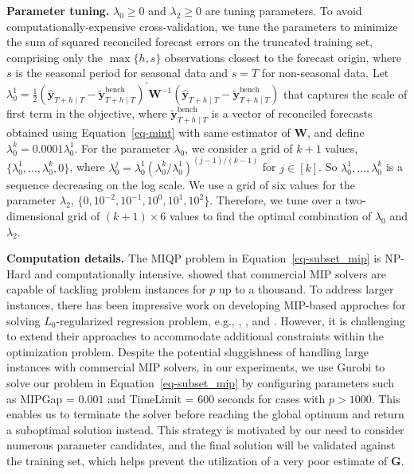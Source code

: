 \documentclass[11pt,a4paper,]{article}
\begin{document}
\textbf{Parameter tuning.} \(\lambda_0 \geq 0\) and \(\lambda_2 \geq 0\)
are tuning parameters. To avoid computationally-expensive
cross-validation, we tune the parameters to minimize the sum of squared
reconciled forecast errors on the truncated training set, comprising
only the \(\max\{h, s\}\) observations closest to the forecast origin,
where \(s\) is the seasonal period for seasonal data and \(s=T\) for
non-seasonal data. Let
\(\lambda_{0}^{1} = \frac{1}{2}\left(\hat{\boldsymbol{y}}_{T+h \mid T}-\tilde{\boldsymbol{y}}_{T+h \mid T}^{\text{bench}}\right)^{\prime} \boldsymbol{W}^{-1}\left(\hat{\boldsymbol{y}}_{T+h \mid T}-\tilde{\boldsymbol{y}}_{T+h \mid T}^{\text{bench}}\right)\)
that captures the scale of first term in the objective, where
\(\tilde{\boldsymbol{y}}_{T+h \mid T}^{\text{bench}}\) is a vector of
reconciled forecasts obtained using Equation~\ref{eq-mint} with same
estimator of \(\boldsymbol{W}\), and define
\(\lambda_{0}^{k} = 0.0001\lambda_{0}^{1}\). For the parameter
\(\lambda_0\), we consider a grid of \(k+1\) values,
\(\{\lambda_{0}^{1},...,\lambda_{0}^{k}, 0\}\), where
\(\lambda_{0}^{j} = \lambda_{0}^{1}\left(\lambda_{0}^{k} / \lambda_{0}^{1}\right)^{(j-1) / (k-1)}\)
for \(j \in [k]\). So \(\lambda_{0}^{1},...,\lambda_{0}^{k}\) is a
sequence decreasing on the log scale. We use a grid of six values for
the parameter \(\lambda_2\),
\(\{0, 10^{-2}, 10^{-1}, 10^{0}, 10^{1}, 10^{2}\}\). Therefore, we tune
over a two-dimensional grid of \((k+1) \times 6\) values to find the
optimal combination of \(\lambda_0\) and \(\lambda_2\).

\textbf{Computation details.} The MIQP problem in
Equation~\ref{eq-subset_mip} is NP-Hard and computationally intensive.
\textcite{Bertsimas2016-ig} showed that commercial MIP solvers are
capable of tackling problem instances for \(p\) up to a thousand. To
address larger instances, there has been impressive work on developing
MIP-based approches for solving \(L_0\)-regularized regression problem,
e.g., \textcite{Bertsimas2016-ig}, \textcite{Hazimeh2020-xd}, and
\textcite{Hazimeh2022-hc}. However, it is challenging to extend their
approaches to accommodate additional constraints within the optimization
problem. Despite the potential sluggishness of handling large instances
with commercial MIP solvers, in our experiments, we use Gurobi to solve
our problem in Equation~\ref{eq-subset_mip} by configuring parameters
such as MIPGap = \(0.001\) and TimeLimit = \(600\) seconds for cases
with \(p > 1000\). This enables us to terminate the solver before
reaching the global optimum and return a suboptimal solution instead.
This strategy is motivated by our need to consider numerous parameter
candidates, and the final solution will be validated against the
training set, which helps prevent the utilization of a very poor
estimate of \(\boldsymbol{G}\).
\end{document}
